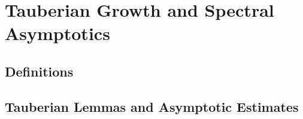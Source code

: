 \section{Tauberian Growth and Spectral Asymptotics}
\label{sec:tauberian-growth}



\subsection{Definitions}


\subsection{Tauberian Lemmas and Asymptotic Estimates}






















